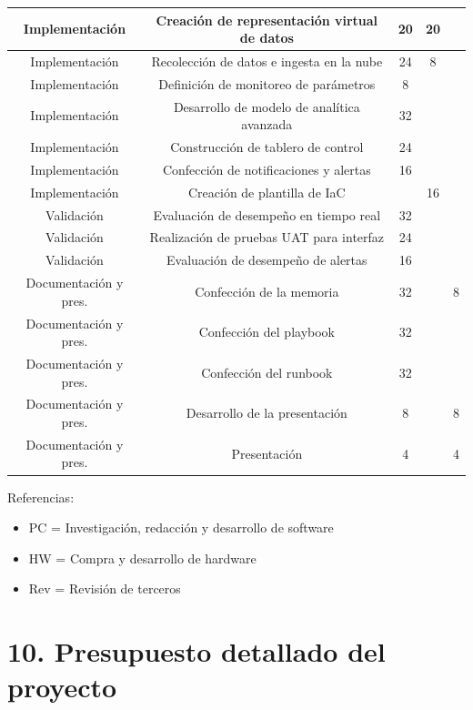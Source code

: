 \documentclass[11pt]{charter}
\begin{document}
\begin{table}
\begin{tabularx}{\linewidth}{@{}|c|c|c|c|c|@{}}
Implementación & Creación de representación virtual de datos &  20 & 20 &  \\ \hline
Implementación & Recolección de datos e ingesta en la nube & 24 & 8  &  \\ \hline
Implementación & Definición de monitoreo de parámetros & 8 &  &  \\ \hline
Implementación & Desarrollo de modelo de analítica avanzada & 32 &  &  \\ \hline
Implementación & Construcción de tablero de control & 24 &  &  \\ \hline
Implementación & Confección de notificaciones y alertas & 16 &  &  \\ \hline
Implementación & Creación de plantilla de IaC &  & 16 &  \\ \hline
Validación & Evaluación de desempeño en tiempo real & 32 &  &  \\ \hline
Validación & Realización de pruebas UAT para interfaz & 24 &  &  \\ \hline
Validación & Evaluación de desempeño de alertas & 16 &  &  \\ \hline
Documentación y pres. & Confección de la memoria & 32 &  & 8 \\ \hline
Documentación y pres.& Confección del playbook & 32 &  &  \\ \hline 
Documentación y pres.& Confección del runbook & 32 &  &  \\ \hline
Documentación y pres.& Desarrollo de la presentación & 8 &  & 8  \\ \hline
Documentación y pres.& Presentación & 4 &  & 4 \\ \hline
\end{tabularx}%
\end{table}

{\footnotesize
Referencias:
\begin{itemize}
	\item PC = Investigación, redacción y desarrollo de software
	\item HW = Compra y desarrollo de hardware
	\item Rev = Revisión de terceros
\end{itemize}
} %


\section{10. Presupuesto detallado del proyecto}
\label{sec:presupuesto}
\end{document}
